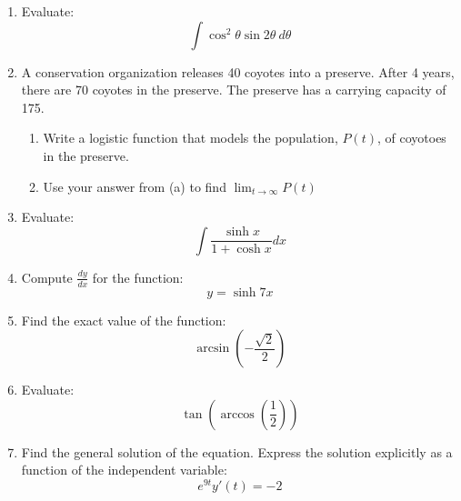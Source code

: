 \documentclass[fleqn]{article}
\begin{document}
\begin{multicols}{2}
\begin{enumerate}
\item Evaluate:
\[\int\cos^2\theta\sin 2\theta\ d\theta\]

\item A conservation organization releases 40 coyotes into a preserve. After 4 years, there are 70 coyotes in the preserve. The preserve has a carrying capacity of 175.
\begin{enumerate}[label=\alph*)]
\item Write a logistic function that models the population, \(P(t)\), of coyotoes in the preserve.
\item Use your answer from (a) to find \(\displaystyle\lim_{t\to\infty}P(t)\)
\end{enumerate}

\item Evaluate:
\[\int\frac{\sinh x}{1+\cosh x}dx\]

\item Compute \(\frac{dy}{dx}\) for the function:
\[y=\sinh 7x\]

\item Find the exact value of the function:
\[\arcsin\left(-\frac{\sqrt{2}}{2}\right)\]

\item Evaluate:
\[\tan\left(\arccos\left(\frac{1}{2}\right)\right)\]

\item Find the general solution of the equation. Express the solution explicitly as a function of the independent variable:
\[e^{9t}y'(t)=-2\]

\end{enumerate}
\end{multicols}
\end{document}
